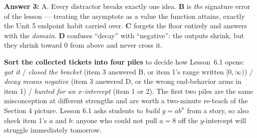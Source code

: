 \documentclass[10pt]{article}
\begin{document}
\begin{teachernote}
\textbf{Answer 3:} A. Every distractor breaks exactly one idea. \textbf{B} is \emph{the} signature
error of the lesson --- treating the asymptote as a value the function attains, exactly the Unit 5
endpoint habit carried over. \textbf{C} forgets the floor entirely and answers with the
\emph{domain}. \textbf{D} confuses ``decay'' with ``negative'': the outputs shrink, but they shrink
toward $0$ from above and never cross it.

\textbf{Sort the collected tickets into four piles} to decide how Lesson~6.1 opens:
\emph{got it} / \emph{closed the bracket} (item 3 answered B, or item 1's range written
$[0,\infty)$) / \emph{decay means negative} (item 3 answered D, or the wrong end-behavior arms in
item 1) / \emph{hunted for an $x$-intercept} (item 1 or 2). The first two piles are the same
misconception at different strengths and are worth a two-minute re-teach of the Section 4 picture.
Lesson 6.1 asks students to \emph{build} $y=ab^{x}$ from a story, so also check item 1's $a$ and $b$:
anyone who could not pull $a=8$ off the $y$-intercept will struggle immediately tomorrow.
\end{teachernote}
\end{document}
